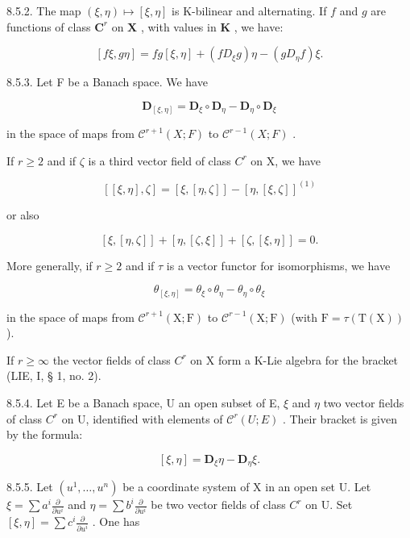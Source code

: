 8.5.2. The map \((\xi, \eta) \mapsto [\xi, \eta]\) is K-bilinear and alternating. If \(f\) and \(g\) are functions of class \(\mathbf{C}^r\) on \(\mathbf{X}\) , with values in \(\mathbf{K}\) , we have:

\[
[ f \xi , g \eta ] = f g [ \xi , \eta ] + (f D _ {\xi} g) \eta - (g D _ {\eta} f) \xi .\tag{2}
\]

8.5.3. Let F be a Banach space. We have

\[
\mathbf {D} _ {[ \xi , \eta ]} = \mathbf {D} _ {\xi} \circ \mathbf {D} _ {\eta} - \mathbf {D} _ {\eta} \circ \mathbf {D} _ {\xi}\tag{3}
\]

in the space of maps from \(\mathcal{C}^{r+1}(X;F)\) to \(\mathcal{C}^{r-1}(X;F)\) .

If \(r \geqslant 2\) and if \(\zeta\) is a third vector field of class \(C^r\) on X, we have

\[
[ [ \xi , \eta ], \zeta ] = [ \xi , [ \eta , \zeta ] ] - [ \eta , [ \xi , \zeta ] ] ^ {(1)}\tag{4}
\]

or also

\[
[ \xi , [ \eta , \zeta ] ] + [ \eta , [ \zeta , \xi ] ] + [ \zeta , [ \xi , \eta ] ] = 0.
\]

More generally, if \(r \geqslant 2\) and if \(\tau\) is a vector functor for isomorphisms, we have

\[
\theta_ {[ \xi , \eta ]} = \theta_ {\xi} \circ \theta _ {\eta} - \theta _ {\eta} \circ \theta_ {\xi}\tag{5}
\]

in the space of maps from \(\mathcal{C}^{r+1}(\mathrm{X};\mathrm{F})\) to \(\mathcal{C}^{r-1}(\mathrm{X};\mathrm{F})\) (with \(\mathrm{F} = \tau (\mathrm{T}(\mathrm{X}))\) ).

If \(r \geqslant \infty\) the vector fields of class \(C^r\) on X form a K-Lie algebra for the bracket (LIE, I, § 1, no. 2).

8.5.4. Let E be a Banach space, U an open subset of E, \(\xi\) and \(\eta\) two vector fields of class \(C^{r}\) on U, identified with elements of \(\mathcal{C}^{r}(U;E)\) . Their bracket is given by the formula:

\[
[ \xi , \eta ] = \mathbf {D} _ {\xi} \eta - \mathbf {D} _ {\eta} \xi .\tag{6}
\]

8.5.5. Let \((u^1, \ldots, u^n)\) be a coordinate system of X in an open set U. Let \(\xi = \sum a^i \frac{\partial}{\partial u^i}\) and \(\eta = \sum b^i \frac{\partial}{\partial u^i}\) be two vector fields of class \(C^r\) on U. Set \([\xi, \eta] = \sum c^i \frac{\partial}{\partial u^i}\) . One has

